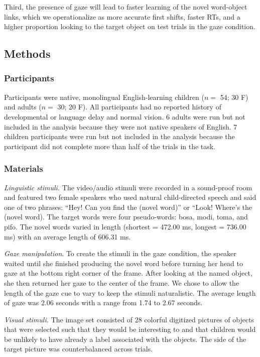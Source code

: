 \documentclass[man,floatsintext]{apa6}
\begin{document}
Third, the presence of gaze will lead to faster learning of the novel
word-object links, which we operationalize as more accurate first
shifts, faster RTs, and a higher proportion looking to the target object
on test trials in the gaze condition.

\subsection{Methods}\label{methods-2}

\subsubsection{Participants}\label{participants-2}

Participants were native, monolingual English-learning children (\(n=\)
54; 30 F) and adults (\(n=\) 30; 20 F). All participants had no reported
history of developmental or language delay and normal vision. 6 adults
were run but not included in the analysis because they were not native
speakers of English. 7 children participants were run but not included
in the analysis because the participant did not complete more than half
of the trials in the task.

\subsubsection{Materials}\label{materials-2}

\emph{Linguistic stimuli.} The video/audio stimuli were recorded in a
sound-proof room and featured two female speakers who used natural
child-directed speech and said one of two phrases: \enquote{Hey! Can you
find the (novel word)} or ``Look! Where's the (novel word). The target
words were four pseudo-words: bosa, modi, toma, and pifo. The novel
words varied in length (shortest = 472.00 ms, longest = 736.00 ms) with
an average length of 606.31 ms.

\emph{Gaze manipulation}. To create the stimuli in the gaze condition,
the speaker waited until she finished producing the novel word before
turning her head to gaze at the bottom right corner of the frame. After
looking at the named object, she then returned her gaze to the center of
the frame. We chose to allow the length of the gaze cue to vary to keep
the stimuli naturalistic. The average length of gaze was 2.06 seconds
with a range from 1.74 to 2.67 seconds.

\emph{Visual stimuli.} The image set consisted of 28 colorful digitized
pictures of objects that were selected such that they would be
interesting to and that children would be unlikely to have already a
label associated with the objects. The side of the target picture was
counterbalanced across trials.
\end{document}
